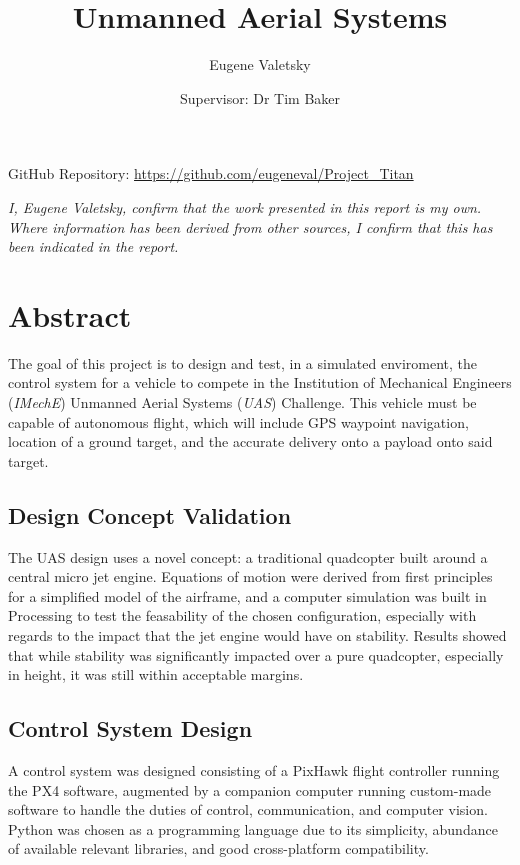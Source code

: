 \documentclass[11pt]{article}
\author{Eugene Valetsky\\ \and Supervisor: Dr Tim Baker}
\title{Unmanned Aerial Systems}
\begin{document}
\maketitle

\begin{center}
    GitHub Repository: \url{https://github.com/eugeneval/Project_Titan}

    \vspace{4em}
    \emph{I, Eugene Valetsky, confirm that the work presented in this report is my own. Where information has been derived from other sources, I confirm that this has been indicated in the report.}
\end{center}

\newpage
\tableofcontents
\listoffigures
\newpage



\section{Abstract}
 The goal of this project is to design and test, in a simulated enviroment, the control system for a vehicle to compete in the Institution of Mechanical Engineers (\emph{IMechE}) Unmanned Aerial Systems (\emph{UAS}) Challenge. This vehicle must be capable of autonomous flight, which will include GPS waypoint navigation, location of a ground target, and the accurate delivery onto a payload onto said target.\cite{IMechE_rules}

\subsection*{Design Concept Validation}
The UAS design uses a novel concept: a traditional quadcopter built around a central micro jet engine\cite{Ismail_paper}. Equations of motion were derived from first principles for a simplified model of the airframe, and a computer simulation was built in Processing\cite{processing} to test the feasability of the chosen configuration, especially with regards to the impact that the jet engine would have on stability. Results showed that while stability was significantly impacted over a pure quadcopter, especially in height, it was still within acceptable margins.

\subsection*{Control System Design}
A control system was designed consisting of a PixHawk flight controller running the PX4 software\cite{PX4_user_guide}, augmented by a companion computer running custom-made software to handle the duties of control, communication, and computer vision. Python\cite{python} was chosen as a programming language due to its simplicity, abundance of available relevant libraries, and good cross-platform compatibility.
\end{document}
